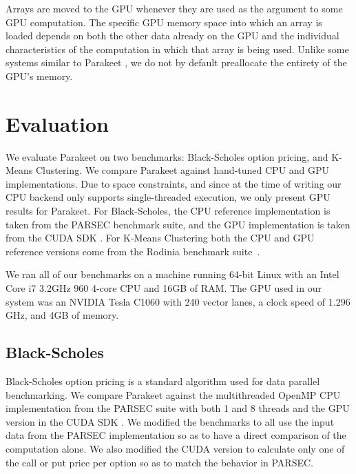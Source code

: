 \documentclass[10pt,twocolumn]{article}
\begin{document}
Arrays are moved to the GPU whenever they are used as the argument to some GPU computation. The specific GPU memory space into which an array is loaded depends on both the other data already on the GPU and the individual characteristics of the computation in which that array is being used.
Unlike some systems similar to Parakeet \cite{Chaf11}, we do not by default preallocate the entirety of the GPU's memory. 

\section{Evaluation}
\label{Evaluation}

We evaluate Parakeet on two benchmarks: Black-Scholes option pricing, and K-Means Clustering.  We compare Parakeet against hand-tuned CPU and GPU implementations.  Due to space constraints, and since at the time of writing our CPU backend only supports single-threaded execution, we only present GPU results for Parakeet.  For Black-Scholes, the CPU reference implementation is taken from the PARSEC \cite{Bien08} benchmark suite, and the GPU implementation is taken from the CUDA SDK \cite{NvidSD}.  For K-Means Clustering both the CPU and GPU reference versions come from the Rodinia benchmark suite~\cite{Che09}.

We ran all of our benchmarks on a machine running 64-bit Linux with an Intel Core i7 3.2GHz 960 4-core CPU  and 16GB of RAM.  The GPU used in our system was an NVIDIA Tesla C1060 with 240 vector lanes, a clock speed of 1.296 GHz, and 4GB of memory.

\subsection{Black-Scholes}
\label{results-bs}

Black-Scholes option pricing \cite{Blac73} is a standard algorithm used for data parallel benchmarking.  We compare Parakeet against the multithreaded OpenMP CPU implementation from the PARSEC \cite{Bien08} suite with both 1 and 8 threads and the GPU version in the CUDA SDK \cite{NvidSD}.  We modified the benchmarks to all use the input data from the PARSEC implementation so as to have a direct comparison of the computation alone.  We also modified the CUDA version to calculate only one of the call or put price per option so as to match the behavior in PARSEC.
\end{document}

